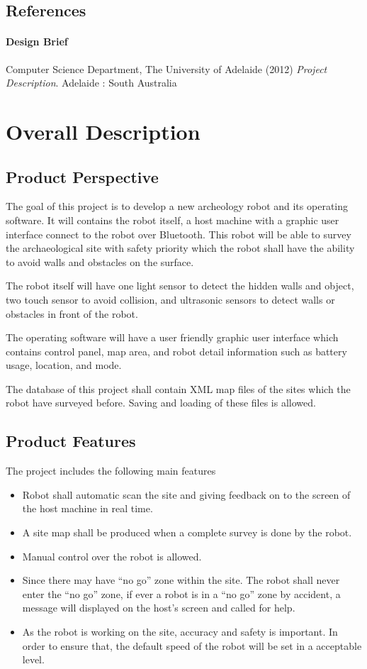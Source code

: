 \documentclass[11pt, a4paper]{report}
\begin{document}
\section{References}
\subsubsection*{Design Brief}
Computer Science Department, The University of Adelaide (2012) \textit{Project Description}. Adelaide : South Australia


\pagebreak



\chapter{Overall Description}

\section{Product Perspective}
The goal of this project is to develop a new archeology robot and its operating software. It will contains the robot itself, a host machine with a graphic user interface connect to the robot over Bluetooth. This robot will be able to survey the archaeological site with safety priority which the robot shall have the ability to avoid walls and obstacles on the surface. 

The robot itself will have one light sensor to detect the hidden walls and object, two touch sensor to avoid collision, and ultrasonic sensors to detect walls or obstacles in front of the robot. 

The operating software will have a user friendly graphic user interface which contains control panel, map area, and robot detail information such as battery usage, location, and mode. 

The database of this project shall contain XML map files of the sites which the robot have surveyed before. Saving and loading of these files is allowed. 

\section{Product Features}
The project includes the following main features
\begin{itemize}
\item Robot shall automatic scan the site and giving feedback on to the screen of the host machine in real time. 
\item A site map shall be produced when a complete survey is done by the robot.
\item Manual control over the robot is allowed. 
\item Since there may have “no go” zone within the site. The robot shall never enter the “no go” zone, if ever a robot is in a “no go” zone by accident, a message will displayed on the host's screen and called for help.
\item As the robot is working on the site, accuracy and safety is important. In order to ensure that, the default speed of the robot will be set in a acceptable level. 
\end{itemize}
\end{document}
